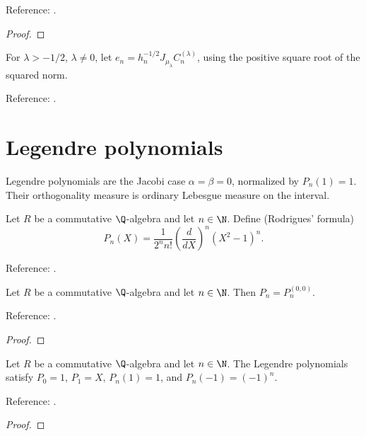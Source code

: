 \begin{supporting}
\begin{theorem}
Reference: \cite[18.2(vi)]{dlmf}.
\end{theorem}
\begin{proof}
\leanok
\end{proof}

\begin{definition}
\label{def:gegenbauer-normalised}
\leanok
For $\lambda>-1/2$, $\lambda\ne0$, let
$e_n=h_n^{-1/2}J_{\mu_\lambda}C_n^{(\lambda)}$, using the positive square root
of the squared norm.

Reference: \cite[Table 18.3.1]{dlmf}.
\end{definition}

\end{supporting}

\section{Legendre polynomials}\label{sec:textbook-classical-legendre}

Legendre polynomials are the Jacobi case $\alpha=\beta=0$, normalized by $P_n(1)=1$. Their orthogonality measure is ordinary Lebesgue measure on the interval.

\begin{definition}
\label{def:legendre}
\leanok
Let $R$ be a commutative $\Q$-algebra and let $n\in\N$. Define (Rodrigues' formula)
\[P_n(X)=\frac{1}{2^n n!}\left(\frac{d}{dX}\right)^n(X^2-1)^n.\]

Reference: \cite[18.5.5, Table 18.5.1 and Table 18.3.1]{dlmf}.
\end{definition}

\begin{theorem}
\label{thm:legendre-jacobi}
\leanok
Let $R$ be a commutative $\Q$-algebra and let $n\in\N$. Then $P_n=P_n^{(0,0)}$.

Reference: \cite[18.7.9]{dlmf}.
\end{theorem}
\begin{proof}
\leanok
\end{proof}

\begin{theorem}
\label{thm:legendre-values}
\leanok
Let $R$ be a commutative $\Q$-algebra and let $n\in\N$. The Legendre polynomials satisfy $P_0=1$, $P_1=X$, $P_n(1)=1$, and $P_n(-1)=(-1)^n$.

Reference: \cite[Table 18.6.1]{dlmf}.
\end{theorem}
\begin{proof}
\leanok
\end{proof}

